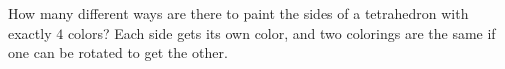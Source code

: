 How many different ways are there to paint the sides of a tetrahedron with exactly $4$ colors?  Each side gets its own color, and two colorings are the same if one can be rotated to get the other.